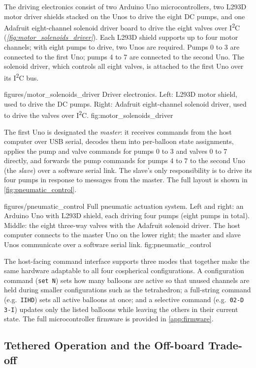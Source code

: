 The driving electronics consist of two Arduino Uno microcontrollers, two L293D motor driver shields stacked on the Unos to drive the eight DC pumps, and one Adafruit eight-channel solenoid driver board to drive the eight valves over I\textsuperscript{2}C (\textit{\cref{fig:motor_solenoids_driver}}). Each L293D shield supports up to four motor channels; with eight pumps to drive, two Unos are required. Pumps 0 to 3 are connected to the first Uno; pumps 4 to 7 are connected to the second Uno. The solenoid driver, which controls all eight valves, is attached to the first Uno over its I\textsuperscript{2}C bus.

\figcap
{figures/motor_solenoids_driver}
{Driver electronics.}
{Left: L293D motor shield, used to drive the DC pumps. Right: Adafruit eight-channel solenoid driver, used to drive the valves over I\textsuperscript{2}C.}
{fig:motor_solenoids_driver}
{\linewidth}

The first Uno is designated the \textit{master}: it receives commands from the host computer over USB serial, decodes them into per-balloon state assignments, applies the pump and valve commands for pumps 0 to 3 and valves 0 to 7 directly, and forwards the pump commands for pumps 4 to 7 to the second Uno (the \textit{slave}) over a software serial link. The slave's only responsibility is to drive its four pumps in response to messages from the master. The full layout is shown in \cref{fig:pneumatic_control}.

\figcap
{figures/pneumatic_control}
{Full pneumatic actuation system.}
{Left and right: an Arduino Uno with L293D shield, each driving four pumps (eight pumps in total). Middle: the eight three-way valves with the Adafruit solenoid driver. The host computer connects to the master Uno on the lower right; the master and slave Unos communicate over a software serial link.}
{fig:pneumatic_control}
{\linewidth}

The host-facing command interface supports three modes that together make the same hardware adaptable to all four cospherical configurations. A configuration command (\texttt{set\,N}) sets how many balloons are active so that unused channels are held during smaller configurations such as the tetrahedron; a full-string command (e.g.\ \texttt{IIHD}) sets all active balloons at once; and a selective command (e.g.\ \texttt{02-D 3-I}) updates only the listed balloons while leaving the others in their current state. The full microcontroller firmware is provided in \cref{app:firmware}.

\subsection{Tethered Operation and the Off-board Trade-off}
\label{subsec:tethered-tradeoff}

